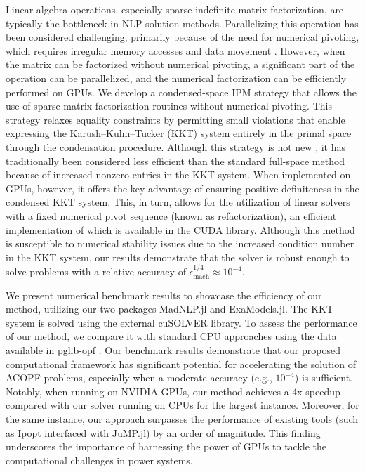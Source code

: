 \documentclass{IEEEtran4PSCC} %
\begin{document}
Linear algebra operations, especially sparse indefinite matrix
factorization, are typically the bottleneck in NLP solution methods.
Parallelizing this operation has been considered challenging,
primarily because of the need for numerical pivoting, which requires irregular
memory accesses and data movement \cite{swirydowicz2022linear}. However, when the matrix can be factorized without
numerical pivoting, a significant part of the operation can be
parallelized, and the numerical factorization can be efficiently
performed on GPUs. We develop a condensed-space IPM strategy that
allows the use of sparse matrix factorization routines without
numerical pivoting. This strategy relaxes equality constraints by
permitting small violations that enable expressing the
Karush--Kuhn--Tucker (KKT) system entirely in the primal space through
the condensation procedure. Although this strategy is not new
\cite{nocedal2006numerical}, it has traditionally been considered less
efficient than the standard full-space method because of increased nonzero
entries in the KKT system. When implemented on GPUs, however, it
offers the key advantage of ensuring positive definiteness in the
condensed KKT system. This, in turn, allows for the utilization
of linear solvers with a fixed numerical pivot sequence (known as
refactorization), an efficient implementation of which is available in the CUDA library.
Although this method is susceptible to numerical stability issues due to
the increased condition number in the KKT system, our results demonstrate
that the solver is robust enough to solve problems with a relative
accuracy of $\epsilon_{\text{mach}}^{1/4}\approx 10^{-4}$.

We present numerical benchmark results to showcase the efficiency of
our method, utilizing our two packages MadNLP.jl and
ExaModels.jl. The  KKT system is solved using the
external cuSOLVER library. To assess the performance of our method, we
compare it with standard CPU approaches using the data available in
pglib-opf \cite{babaeinejadsarookolaee2019power}.  Our benchmark results
demonstrate that our proposed computational framework has significant
potential for accelerating the solution of ACOPF problems, especially
when a moderate accuracy (e.g., $10^{-4}$) is sufficient.
Notably, when running on NVIDIA GPUs, our method achieves a
4x speedup compared with our solver running on CPUs for
the largest instance. Moreover, for the same instance, our approach
surpasses the performance of existing tools (such as Ipopt interfaced
with JuMP.jl) by an order of magnitude. This finding underscores the
importance of harnessing the power of GPUs to tackle
the computational challenges in power systems.
\end{document}
